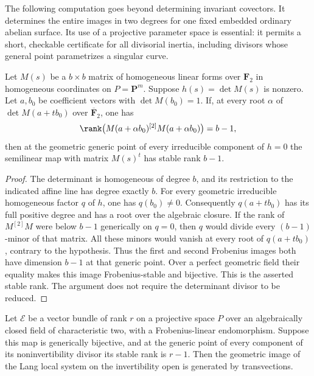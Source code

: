 The following computation goes beyond determining invariant covectors.
It determines the entire images in two degrees for one fixed embedded
ordinary abelian surface.  Its use of a projective parameter space is
essential: it permits a short, checkable certificate for all divisorial
inertia, including divisors whose general point parametrizes a singular
curve.

\begin{lemma}
\label{lem:hasse-line-certificate}
Let $M(s)$ be a $b\times b$ matrix of homogeneous linear forms over
$\mathbf F_2$ in homogeneous coordinates on $P=\mathbf P^m$.
Suppose $h(s)=\det M(s)$ is nonzero.  Let $a,b_0$ be coefficient
vectors with $\det M(b_0)=1$.  If, at every root $\alpha$ of
$\det M(a+t b_0)$ over $\overline{\mathbf F}_2$, one has
\[
 \rank\bigl(M(a+\alpha b_0)^{[2]}M(a+\alpha b_0)\bigr)=b-1,
\]
then at the geometric generic point of every irreducible component
of $h=0$ the semilinear map with matrix $M(s)^t$ has stable rank
$b-1$.
\end{lemma}

\begin{proof}
The determinant is homogeneous of degree $b$, and its restriction to
the indicated affine line has degree exactly $b$.  For every geometric
irreducible homogeneous factor $q$ of $h$, one has $q(b_0)\ne0$.
Consequently $q(a+t b_0)$ has its full positive degree and has a root
over the algebraic closure.  If the rank of $M^{[2]}M$ were below
$b-1$ generically on $q=0$, then $q$ would divide every $(b-1)$-minor
of that matrix.  All these minors would vanish at every root of
$q(a+t b_0)$, contrary to the hypothesis.  Thus the first and second
Frobenius images both have dimension $b-1$ at that generic point.
Over a perfect geometric field their equality makes this image
Frobenius-stable and bijective.  This is the asserted stable rank.
The argument does not require the determinant divisor to be reduced.
\end{proof}

\begin{lemma}
\label{lem:char2-defect-one-inertia}
Let $\mathcal E$ be a vector bundle of rank $r$ on a projective space
$P$ over an algebraically closed field of characteristic two, with
a Frobenius-linear endomorphism.  Suppose this map is generically
bijective, and at the generic point of every component of its
noninvertibility divisor its stable rank is $r-1$.
Then the geometric image of the Lang local system on the
invertibility open is generated by transvections.
\end{lemma}

